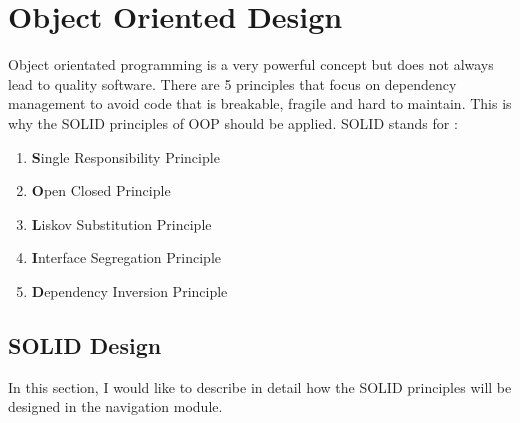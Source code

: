 \section{Object Oriented Design}
    Object orientated programming is a very powerful concept but does not always lead to quality
    software. There are 5 principles that focus on dependency management to avoid code that
    is breakable, fragile and hard to maintain. This is why the SOLID \cite{Hotop2015} 
    principles of OOP should be applied.
    SOLID stands for :
    \begin{enumerate}
        \item 
            \textbf{S}ingle Responsibility Principle
        \item 
            \textbf{O}pen Closed Principle
        \item 
            \textbf{L}iskov Substitution Principle
        \item 
            \textbf{I}nterface Segregation Principle
        \item 
            \textbf{D}ependency Inversion Principle
    \end{enumerate}

    \subsection{SOLID Design}
        In this section, I would like to describe in detail how the SOLID principles will 
        be designed in the navigation module.
